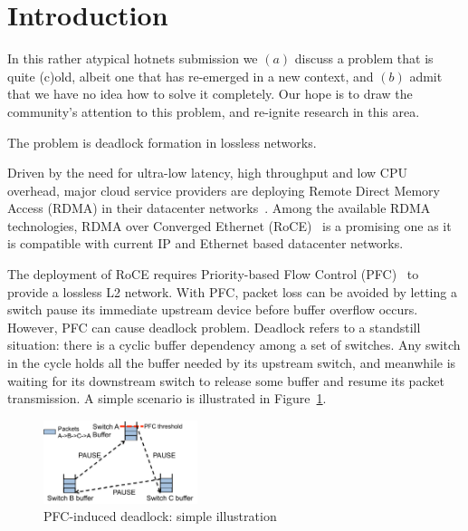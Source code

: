 \secspace
\section{Introduction}
\secspace
\label{sec:intro}

In this rather atypical hotnets submission we $(a)$ discuss a problem that is
quite (c)old, albeit one that has re-emerged in a new context, and $(b)$ admit
that we have no idea how to solve it completely. Our hope is to draw the
community's attention to this problem, and re-ignite research in this area.

The problem is deadlock formation in lossless networks.

Driven by the need for ultra-low latency, high throughput and low CPU overhead,
major cloud service providers are deploying Remote Direct Memory Access (RDMA) in
their datacenter networks~\cite{dcqcn,timely}. Among the
available RDMA technologies,  RDMA over Converged Ethernet (RoCE)~\cite{roce} is
a promising one as it is compatible with current IP and Ethernet based
datacenter networks.

The deployment of RoCE requires Priority-based Flow Control (PFC)~\cite{pfc} to
provide a lossless L2 network. With PFC, packet loss can be avoided by letting a
switch pause its immediate upstream device before buffer overflow occurs.
However, PFC can cause deadlock problem. Deadlock refers to a
standstill situation: there is a cyclic buffer dependency among a set of
switches. Any switch in the cycle holds all the buffer needed by its upstream
switch, and meanwhile is waiting for its downstream switch to release some
buffer and resume its packet transmission. A simple scenario is illustrated in
Figure~\ref{fig:deadlock_example}.

\begin{figure}
\centering
\includegraphics[width=0.4\textwidth] {figs/deadlock}
\vspace{-0.15in}
\caption{PFC-induced deadlock: simple illustration}
\vspace{-0.15in}
\label{fig:deadlock_example}
\end{figure}


